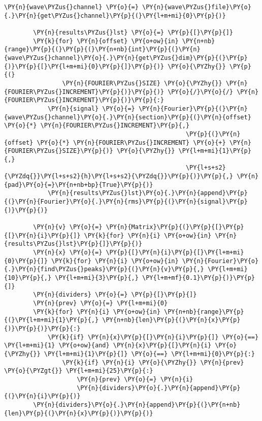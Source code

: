 \begin{Verbatim}[commandchars=\\\{\}]
        \PY{n}{wave\PYZus{}channel} \PY{o}{=} \PY{n}{wave\PYZus{}file}\PY{o}{.}\PY{n}{get\PYZus{}channel}\PY{p}{(}\PY{l+m+mi}{0}\PY{p}{)}

        \PY{n}{results\PYZus{}lst} \PY{o}{=} \PY{p}{[}\PY{p}{]}
        \PY{k}{for} \PY{n}{offset} \PY{o+ow}{in} \PY{n+nb}{range}\PY{p}{(}\PY{p}{(}\PY{n+nb}{int}\PY{p}{(}\PY{n}{wave\PYZus{}channel}\PY{o}{.}\PY{n}{get\PYZus{}dim}\PY{p}{(}\PY{p}{)}\PY{p}{[}\PY{l+m+mi}{0}\PY{p}{]}\PY{p}{)} \PY{o}{\PYZhy{}} \PY{p}{(}
                \PY{n}{FOURIER\PYZus{}SIZE} \PY{o}{\PYZhy{}} \PY{n}{FOURIER\PYZus{}INCREMENT}\PY{p}{)}\PY{p}{)} \PY{o}{/}\PY{o}{/} \PY{n}{FOURIER\PYZus{}INCREMENT}\PY{p}{)}\PY{p}{:}
            \PY{n}{signal} \PY{o}{=} \PY{n}{Fourier}\PY{p}{(}\PY{n}{wave\PYZus{}channel}\PY{o}{.}\PY{n}{section}\PY{p}{(}\PY{n}{offset} \PY{o}{*} \PY{n}{FOURIER\PYZus{}INCREMENT}\PY{p}{,}
                                                  \PY{p}{(}\PY{n}{offset} \PY{o}{*} \PY{n}{FOURIER\PYZus{}INCREMENT} \PY{o}{+} \PY{n}{FOURIER\PYZus{}SIZE}\PY{p}{)} \PY{o}{\PYZhy{}} \PY{l+m+mi}{1}\PY{p}{,}
                                                  \PY{l+s+s2}{\PYZdq{}}\PY{l+s+s2}{h}\PY{l+s+s2}{\PYZdq{}}\PY{p}{)}\PY{p}{,} \PY{n}{pad}\PY{o}{=}\PY{n+nb+bp}{True}\PY{p}{)}
            \PY{n}{results\PYZus{}lst}\PY{o}{.}\PY{n}{append}\PY{p}{(}\PY{n}{Fourier}\PY{o}{.}\PY{n}{rms}\PY{p}{(}\PY{n}{signal}\PY{p}{)}\PY{p}{)}

        \PY{n}{v} \PY{o}{=} \PY{n}{Matrix}\PY{p}{(}\PY{p}{[}\PY{p}{[}\PY{n}{i}\PY{p}{]} \PY{k}{for} \PY{n}{i} \PY{o+ow}{in} \PY{n}{results\PYZus{}lst}\PY{p}{]}\PY{p}{)}
        \PY{n}{x} \PY{o}{=} \PY{p}{[}\PY{n}{i}\PY{p}{[}\PY{l+m+mi}{0}\PY{p}{]} \PY{k}{for} \PY{n}{i} \PY{o+ow}{in} \PY{n}{Fourier}\PY{o}{.}\PY{n}{find\PYZus{}peaks}\PY{p}{(}\PY{n}{v}\PY{p}{,} \PY{l+m+mi}{10}\PY{p}{,} \PY{l+m+mi}{3}\PY{p}{,} \PY{l+m+mf}{0.1}\PY{p}{)}\PY{p}{]}
        \PY{n}{dividers} \PY{o}{=} \PY{p}{[}\PY{p}{]}
        \PY{n}{prev} \PY{o}{=} \PY{l+m+mi}{0}
        \PY{k}{for} \PY{n}{i} \PY{o+ow}{in} \PY{n+nb}{range}\PY{p}{(}\PY{l+m+mi}{1}\PY{p}{,} \PY{n+nb}{len}\PY{p}{(}\PY{n}{x}\PY{p}{)}\PY{p}{)}\PY{p}{:}
            \PY{k}{if} \PY{n}{x}\PY{p}{[}\PY{n}{i}\PY{p}{]} \PY{o}{==} \PY{l+m+mi}{1} \PY{o+ow}{and} \PY{n}{x}\PY{p}{[}\PY{n}{i} \PY{o}{\PYZhy{}} \PY{l+m+mi}{1}\PY{p}{]} \PY{o}{==} \PY{l+m+mi}{0}\PY{p}{:}
                \PY{k}{if} \PY{n}{i} \PY{o}{\PYZhy{}} \PY{n}{prev} \PY{o}{\PYZgt{}} \PY{l+m+mi}{25}\PY{p}{:}
                    \PY{n}{prev} \PY{o}{=} \PY{n}{i}
                    \PY{n}{dividers}\PY{o}{.}\PY{n}{append}\PY{p}{(}\PY{n}{i}\PY{p}{)}
        \PY{n}{dividers}\PY{o}{.}\PY{n}{append}\PY{p}{(}\PY{n+nb}{len}\PY{p}{(}\PY{n}{x}\PY{p}{)}\PY{p}{)}
        

\end{Verbatim}
